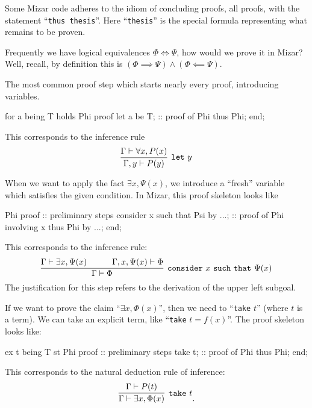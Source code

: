 \begin{remark}
Some Mizar code adheres to the idiom of concluding proofs, all proofs,
with the statement ``\verb#thus thesis#''. Here ``\verb#thesis#'' is the
special formula representing what remains to be proven.
\end{remark}

\begin{exercise}
Frequently we have logical equivalences $\Phi\iff\Psi$, how would we
prove it in Mizar? Well, recall, by definition this is
$(\Phi\implies\Psi)\land(\Phi\impliedby\Psi)$.
\end{exercise}

The most common proof step which starts nearly every proof, introducing
variables.

\begin{mizar}
for a being T holds Phi
proof
  let a be T;
  :: proof of Phi
  thus Phi;
end;
\end{mizar}

This corresponds to the inference rule
\begin{equation}
\infer[\mathtt{let}~y]{\Gamma,y\vdash P(y)}{\Gamma\vdash\forall x,P(x)}
\end{equation}

When we want to apply the fact $\exists x,\Psi(x)$, we introduce a
``fresh'' variable which satisfies the given condition. In Mizar, this
proof skeleton looks like
\begin{mizar}
Phi
proof
  :: preliminary steps
  consider x such that Psi by ...;
  :: proof of Phi involving x
  thus Phi by ...;
end;
\end{mizar}
This corresponds to the inference rule:
\begin{equation}
\infer[\mathtt{consider}~x~\mathtt{such~that}~\Psi(x)]{\Gamma\vdash\Phi}{%
  \Gamma\vdash\exists x,\Psi(x)
  &\qquad\Gamma,x,\Psi(x)\vdash\Phi}
\end{equation}
The justification for this step refers to the derivation of the upper
left subgoal.

If we want to prove the claim ``$\exists x,\Phi(x)$'', then we need to
``\verb#take# $t$'' (where $t$ is a term). We can take an explicit term,
like ``\verb#take# $t = f(x)$''. The proof skeleton looks like:
\begin{mizar}
ex t being T st Phi
proof
  :: preliminary steps
  take t;
  :: proof of Phi
  thus Phi;
end;
\end{mizar}
This corresponds to the natural deduction rule of inference:
\begin{equation}
  \infer[\mathtt{take}~t]{\Gamma\vdash\exists x,\Phi(x)}{\Gamma\vdash P(t)}.
\end{equation}

